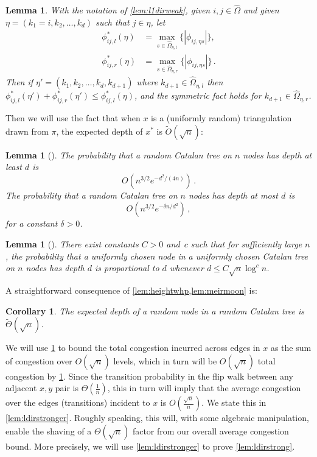 \documentclass[a4paper, 12p]{article}
\numberwithin{equation}{section}
\newcommand{\Omorproj}{\hat{\Omega}}
\newtheorem{lemma}[theorem]{Lemma}
\newtheorem{corollary}[theorem]{Corollary}
\begin{document}
\begin{lemma}
    \label{lem:rhodecomp}
    With the notation of \cref{lem:l1dirweak}, given $i,j\in \Omorproj$ and given  $\eta = (k_1 = i, k_2, \dots, k_d)$ such that $j \in \eta$, let 
    \begin{align*}
        \phi_{ij,l}^*(\eta) &= \max_{s \in \Omorproj_{\eta,l}}\{|\phi_{ij,\eta s}|\}, \\
        \phi_{ij,r}^*(\eta) &= \max_{s \in \Omorproj_{\eta,r} }\{|\phi_{ij,\eta s} |\}\,.
    \end{align*}
    Then  if $\eta' = (k_1, k_2, \dots, k_d, k_{d+1})$ where $k_{d+1} \in \Omorproj_{\eta,l}$ then $\phi_{ij,l}^*(\eta') + \phi_{ij,r}^*(\eta') \leq \phi_{ij,l}^*(\eta)$, and the symmetric fact holds for $k_{d+1} \in \Omorproj_{\eta, r}$.

\end{lemma}

Then we will use the fact that when $x$ is a (uniformly random) triangulation drawn from $\pi$, the expected depth of $x^*$ is $\widetilde O(\sqrt n)$:


\begin{lemma}[\cite{fgor}]
    The probability that a random Catalan tree on $n$ nodes has depth at least $d$ is
    \[
        O\left(n^{3/2}e^{-d^2/(4n)}\right)\,.
    \]
    The probability that a random Catalan tree on $n$ nodes has depth at most $d$ is 
    \[
        O\left(n^{3/2}e^{-\delta n / d^2}\right)\,,
    \]
    for a constant $\delta > 0$.
    \label{lem:heightwhp}
\end{lemma}

\begin{lemma}[\cite{meirmoon}]
    \label{lem:meirmoon}
    There exist constants $C>0$ and~$c$ such that for sufficiently large $n$, the probability that a uniformly chosen node in a uniformly chosen Catalan tree on $n$ nodes has depth $d$ is proportional to $d$ whenever $d \leq C \sqrt n \log^c n$.
\end{lemma}


A straightforward consequence of \cref{lem:heightwhp,lem:meirmoon} is:

\begin{corollary}
    \label{lem:expdepth}
    The expected depth of a random node in a random Catalan tree is $\widetilde \Theta(\sqrt n)$.
\end{corollary}


We will use \cref{lem:expdepth} to bound the total congestion incurred across edges in $x$ as the sum of congestion over $O(\sqrt n)$ levels, which in turn will be $O(\sqrt n)$ total congestion by \cref{lem:rhodecomp}. Since the transition probability in the flip walk between any adjacent $x,y$ pair is $\Theta\left(\frac{1}{n}\right)$, this in turn will imply that the average congestion over the edges (transitions) incident to $x$ is $O\left(\frac{\sqrt n}{n}\right)$. We state this in \cref{lem:ldirstronger}. Roughly speaking, this will, with some algebraic manipulation, enable the shaving of a $\Theta(\sqrt{n})$ factor from our overall average congestion bound. More precisely, we will use \cref{lem:ldirstronger} to prove \cref{lem:ldirstrong}.
\end{document}
